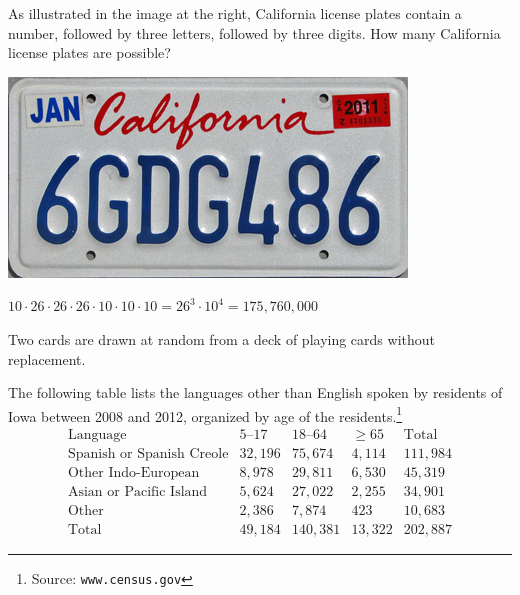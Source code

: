 \documentclass[answers,addpoints,12pt]{exam}
\begin{document}
\begin{questions}

\begin{multicols}{2}
\question[10]
As illustrated in the image at the right,
California license plates contain a number,
followed by three letters, followed by three digits.
How many California license plates are possible?\\
\columnbreak
\begin{center}\includegraphics[scale=.4]{California}
\end{center}
\end{multicols}
\begin{solution}{\vfill}
$10\cdot 26\cdot 26\cdot 26\cdot 10\cdot 10\cdot 10=26^3\cdot 10^4
=175,760,000$
\end{solution}
\newpage

\question[16] Two cards are drawn at random from a deck of playing cards
without replacement.

\question[18] The following table lists
the languages other than English spoken by residents
of Iowa between 2008 and 2012, organized by age
of the residents.\footnote{Source: {\tt www.census.gov}}
\[\begin{array}{r|rrr|r}
\text{Language}&\text{$5$--$17$}
&\text{$18$--$64$}&\ge 65&\text{Total}\\\hline
\text{Spanish or Spanish Creole}&32,196&75,674&4,114&111,984\\
\text{Other Indo-European}&8,978&29,811&6,530&45,319\\
\text{Asian or Pacific Island}&5,624&27,022&2,255&34,901\\
\text{Other}&2,386&7,874&423&10,683\\\hline
\text{Total}&49,184&140,381&13,322&202,887
\end{array}\]
\begin{parts}

\end{parts}
\end{questions}
\end{document}
